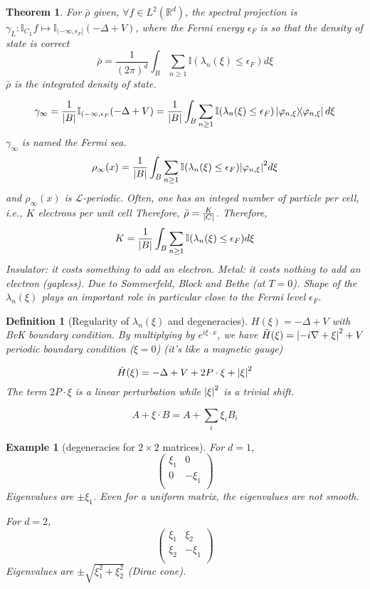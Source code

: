 \documentclass{article}
\newtheorem*{theorem}{Theorem}
\newtheorem*{definition}{Definition}
\newtheorem*{example}{Example}
\newcommand{\RR}{\mathbb{R}}
\newcommand{\II}{\mathbb{I}}
\newcommand{\cL}{\mathcal{L}}
\newcommand{\eps}{\epsilon}
\newcommand{\la}{\lambda}
\begin{document}
\begin{theorem}
  For $\bar{\rho}$ given, $\forall f \in L^2(\RR^d)$, the spectral projection is $\gamma_L \colon \II_{C_L} f \mapsto \II_{(-\infty,\eps_F]} (-\Delta+V)$, 
    where the Fermi energy $\eps_F$ is so that the density of state is correct 
    $$ \bar{\rho} = \frac{1}{(2\pi)^d} \int_B \sum_{n \ge 1} \II(\la_n(\xi) \le \eps_F) d\xi$$
    $\bar{\rho}$ is the integrated density of state.

    $$ \gamma_{\infty} = \frac{1}{\abs{B}} \II_{(-\infty,\eps_F}(-\Delta+V) 
                    = \frac{1}{\abs{B}} \int_B \sum_{n \ge 1} \II(\la_n(\xi) \le \eps_F) \dyad{\varphi_{n,\xi}} d\xi $$
    $\gamma_{\infty}$ is named the Fermi sea.
    $$ \rho_{\infty}(x) = \frac{1}{\abs{B}} \int_B \sum_{n \ge 1} \II(\la_n(\xi) \le \eps_F) \abs{\varphi_{n,\xi}}^2 d\xi $$
    and $\rho_{\infty}(x)$ is $\cL$-periodic.
    Often, one has an integed number of particle per cell, i.e., $K$ electrons per unit cell
    Therefore, $\Bar{\rho} = \frac{K}{\abs{C}}$. Therefore, 
    $$ K = \frac{1}{\abs{B}} \int_B \sum_{n \ge 1} \II(\la_n(\xi) \le \eps_F) d\xi $$
    Insulator: it costs something to add an electron.
    Metal: it costs nothing to add an electron (gapless).
    Due to Sommerfeld, Block and Bethe (at $T = 0$).
    Shape of the $\la_n(\xi)$ plays an important role in particular close to the Fermi level $\eps_F$.
\end{theorem}
    
\begin{definition}[Regularity of $\la_n(\xi)$ and degeneracies]
    $H(\xi) = -\Delta+V$ with BvK boundary condition. 
    By multiplying by $e^{i\xi \cdot x}$, we have
    $\Tilde{H}(\xi) = \abs{-i \nabla+\xi}^2 + V$ periodic boundary condition ($\xi = 0$)
    (it's like a magnetic gauge)

    $$ \Tilde{H}(\xi) = -\Delta + V + 2 P\cdot\xi + \abs{\xi}^2 $$
    The term $2 P\cdot\xi$ is a linear perturbation while $\abs{\xi}^2$ is a trivial shift.

    $$ A + \xi \cdot B = A + \sum_i \xi_i B_i $$
\end{definition}

\begin{example}[degeneracies for $2\times2$ matrices]
    For $d = 1$, 
    $$\begin{pmatrix}
      \xi_1 &     0   \\
      0    & -\xi_1 \\
    \end{pmatrix}$$
    Eigenvalues are $\pm\xi_1$.
    Even for a uniform matrix, the eigenvalues are not smooth.

    For $d = 2$,
    $$\begin{pmatrix}
      \xi_1 &  \xi_2 \\
      \xi_2 & -\xi_1 \\
    \end{pmatrix}$$
    Eigenvalues are $\pm\sqrt{\xi_1^2 + \xi_2^2}$ (Dirac cone).
\end{example}
\end{document}
